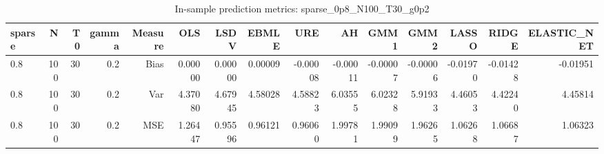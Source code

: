 \begin{table}[!htbp]\centering
\caption{In-sample prediction metrics: sparse_0p8_N100_T30_g0p2}
\label{tab:table2_sparse_0p8_N100_T30_g0p2}
\begin{tabular}{lrrrrrrrrrrrrrr}
\hline
sparse & N & T0 & gamma & Measure & OLS & LSDV & EBMLE & URE & AH & GMM1 & GMM2 & LASSO & RIDGE & ELASTIC_NET \\
\hline
0.8 & 100 & 30 & 0.2 & Bias & 0.00000 & 0.00000 & 0.00009 & -0.00008 & -0.00011 & -0.00007 & -0.00006 & -0.01970 & -0.01428 & -0.01951 \\
0.8 & 100 & 30 & 0.2 & Var & 4.37080 & 4.67945 & 4.58028 & 4.58823 & 6.03555 & 6.02328 & 5.91933 & 4.46053 & 4.42240 & 4.45814 \\
0.8 & 100 & 30 & 0.2 & MSE & 1.26447 & 0.95596 & 0.96121 & 0.96060 & 1.99781 & 1.99099 & 1.96265 & 1.06268 & 1.06687 & 1.06323 \\
\hline
\end{tabular}
\end{table}


